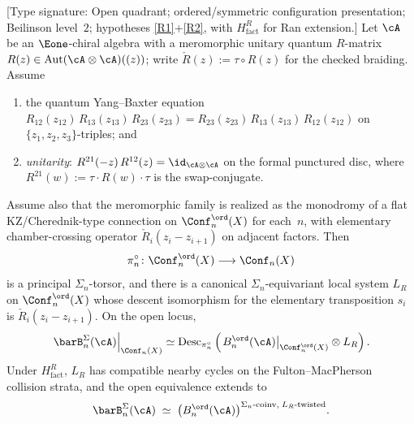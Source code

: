 \begin{lemma}
\label{lem:R-twisted-descent-unitary}%
\textup{[Type signature: Open quadrant; ordered/symmetric
configuration presentation; Beilinson level~$2$; hypotheses
\ref{R1}+\ref{R2}, with $H_{\mathrm{fact}}^{R}$ for Ran extension.]}
Let $\cA$ be an $\Eone$-chiral algebra with a meromorphic unitary
quantum $R$-matrix
$R(z) \in \operatorname{Aut}(\cA \otimes \cA)((z))$; write
$\check R(z):=\tau\circ R(z)$ for the checked braiding. Assume
\begin{enumerate}[label=\textup{(R\arabic*)}]
\item \label{R1} the quantum Yang--Baxter equation
$R_{12}(z_{12})\,R_{13}(z_{13})\,R_{23}(z_{23})
=R_{23}(z_{23})\,R_{13}(z_{13})\,R_{12}(z_{12})$ on
$\{z_1,z_2,z_3\}$-triples; and
\item \label{R2} \emph{unitarity}: $R^{21}(-z)\,R^{12}(z)=\id_{\cA\otimes\cA}$
on the formal punctured disc, where
$R^{21}(w):=\tau\cdot R(w)\cdot\tau$ is the swap-conjugate.
\end{enumerate}
Assume also that the meromorphic family is realized as the monodromy
of a flat KZ/Cherednik-type connection on
$\Conf^{\ord}_n(X)$ for each~$n$, with elementary chamber-crossing
operator $\check R_i(z_i-z_{i+1})$ on adjacent factors.
Then
\[
 \pi_n^\circ\colon\Conf_n^{\ord}(X)\longrightarrow\Conf_n(X)
\]
is a principal $\Sigma_n$-torsor, and there is a canonical
$\Sigma_n$-equivariant local system $L_R$ on
$\Conf^{\ord}_n(X)$ whose descent isomorphism for the elementary
transposition $s_i$ is $\check R_i(z_i-z_{i+1})$.  On the open locus,
\[
 \left.\barB^{\Sigma}_n(\cA)\right|_{\Conf_n(X)}
 \simeq
 \operatorname{Desc}_{\pi_n^\circ}
 \left(\left.B^{\ord}_n(\cA)\right|_{\Conf_n^{\ord}(X)}\otimes L_R\right).
\]
Under $H_{\mathrm{fact}}^{R}$, $L_R$ has compatible nearby cycles on
the Fulton--MacPherson collision strata, and the open equivalence
extends to
\[
\barB^{\Sigma}_n(\cA)
\;\simeq\;
\bigl(B^{\ord}_n(\cA)\bigr)^{\Sigma_n\text{-coinv},\; L_R\text{-twisted}}.
\]
\end{lemma}

